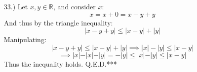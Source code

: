 \documentclass[12pt]{article}
\newcommand{\contradiction}{
    \ensuremath{{\Rightarrow\mspace{-2mu}\Leftarrow}}
}
\newcommand{\vertb}[1]{\left\vert#1\right\vert}
\begin{document}
\pagestyle{fancy}
\fancyhead{}

\normalsize
\begin{itemize}




    \item [33.)] Let $x,y\in\mathbb{R}$, and consider $x$:
        \[x=x+0=x-y+y\]
        And thus by the triangle inequality:
        \[\vertb{x-y+y}\leq\vertb{x-y}+\vertb{y}\]
        Manipulating:
        \[\vert
        x-y+y\vert\leq\vertb{x-y}+\vertb{y}\implies\vertb{x}-\vertb{y}\leq\vertb{x-y}\]
        \[\implies\vert x\vert-\vert x\vert-\vert y\vert=-\vert y\vert\leq\vert x\vert-\vert y\vert\leq\vert x-y\vert\]
        Thus the inequality holds. Q.E.D.***




\end{itemize}
\end{document}
